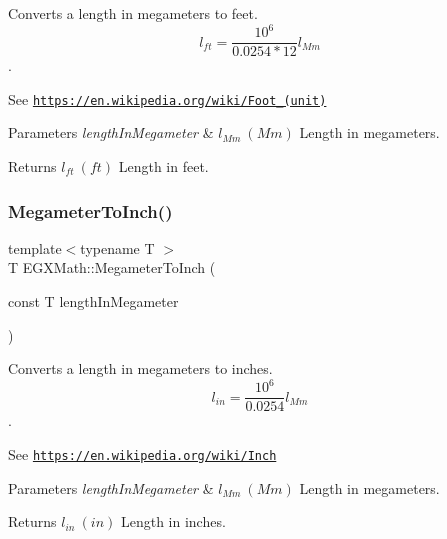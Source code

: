 Converts a length in megameters to feet. \[ l_{ft}= \frac{10^{6}}{0.0254 * 12} l_{Mm} \]. 

See \href{https://en.wikipedia.org/wiki/Foot_(unit)}{\tt https\+://en.\+wikipedia.\+org/wiki/\+Foot\+\_\+(unit)} 
\begin{DoxyParams}{Parameters}
{\em length\+In\+Megameter} & $ l_{Mm}\ (Mm)$ Length in megameters. \\
\hline
\end{DoxyParams}
\begin{DoxyReturn}{Returns}
$ l_{ft}\ (ft)$ Length in feet. 
\end{DoxyReturn}
\mbox{\label{group___e_g_x_math-_conversions-_length_conversions-_megameter-_imperial_ga21eaef4c8ebcc2982ac3a212dc462a95}} 
\subsubsection{\texorpdfstring{Megameter\+To\+Inch()}{MegameterToInch()}}
{\footnotesize\ttfamily template$<$typename T $>$ \\
T E\+G\+X\+Math\+::\+Megameter\+To\+Inch (\begin{DoxyParamCaption}\item[{const T}]{length\+In\+Megameter }\end{DoxyParamCaption})}



Converts a length in megameters to inches. \[ l_{in}= \frac{10^{6}}{0.0254} l_{Mm} \]. 

See \href{https://en.wikipedia.org/wiki/Inch}{\tt https\+://en.\+wikipedia.\+org/wiki/\+Inch} 
\begin{DoxyParams}{Parameters}
{\em length\+In\+Megameter} & $ l_{Mm}\ (Mm)$ Length in megameters. \\
\hline
\end{DoxyParams}
\begin{DoxyReturn}{Returns}
$ l_{in}\ (in)$ Length in inches. 
\end{DoxyReturn}
\mbox{\label{group___e_g_x_math-_conversions-_length_conversions-_megameter-_imperial_ga9494edd6659b7f69549d4fe96b9e2f98}} 
